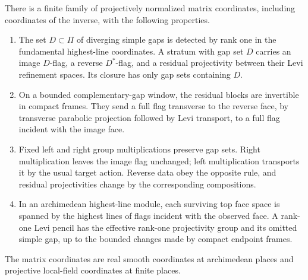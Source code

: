 \begin{lemma}
\label{lem:links-matrix-data}
There is a finite family of projectively normalized matrix coordinates,
including coordinates of the inverse, with the following properties.
\begin{enumerate}[label=(\roman*)]
\item The set \(D\subset\Pi\) of diverging simple gaps is detected
by rank one in the fundamental highest-line coordinates. A stratum
with gap set \(D\) carries an image \(D\)-flag, a reverse
\(D^*\)-flag, and a residual projectivity between their Levi
refinement spaces. Its closure has only gap sets containing \(D\).
\item On a bounded complementary-gap window, the residual blocks are
invertible in compact frames. They send a full flag transverse to the
reverse face, by transverse parabolic projection followed by Levi
transport, to a full flag incident with the image face.
\item Fixed left and right group multiplications preserve gap sets.
Right multiplication leaves the image flag unchanged; left
multiplication transports it by the usual target action. Reverse data
obey the opposite rule, and residual projectivities change by the
corresponding compositions.
\item In an archimedean highest-line module, each surviving top face
space is spanned by the highest lines of flags incident with the
observed face. A rank-one Levi pencil has the effective rank-one
projectivity group and its omitted simple gap, up to the bounded
changes made by compact endpoint frames.
\end{enumerate}
The matrix coordinates are real smooth coordinates at archimedean
places and projective local-field coordinates at finite places.
\end{lemma}


